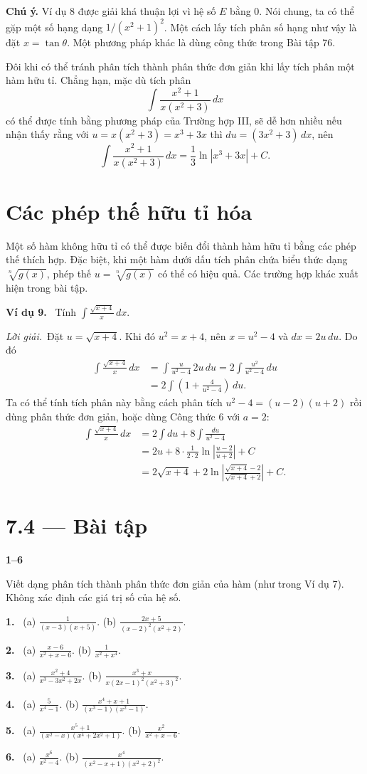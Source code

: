 \documentclass[12pt,a4paper]{article}
\newcommand{\ex}[1]{\par\medskip\noindent\textbf{Ví dụ #1.}\ }
\newcommand{\sol}{\par\nopagebreak[4]\noindent\textit{Lời giải.}\ }
\newcommand{\bt}[1]{\par\smallskip\Needspace{5\baselineskip}\noindent\textbf{#1.}\ }
\newcommand{\group}[1]{\par\Needspace{11\baselineskip}\medskip\noindent\textbf{#1}\par\nopagebreak[4]}
\begin{document}
\textbf{Chú ý.} Ví dụ 8 được giải khá thuận lợi vì hệ số $E$ bằng $0$. Nói chung, ta có thể gặp một số hạng dạng $1/(x^2+1)^2$. Một cách lấy tích phân số hạng như vậy là đặt $x=\tan\theta$. Một phương pháp khác là dùng công thức trong Bài tập 76.

Đôi khi có thể tránh phân tích thành phân thức đơn giản khi lấy tích phân một hàm hữu tỉ. Chẳng hạn, mặc dù tích phân
\[\int\frac{x^2+1}{x(x^2+3)}\,dx\]
có thể được tính bằng phương pháp của Trường hợp III, sẽ dễ hơn nhiều nếu nhận thấy rằng với $u=x(x^2+3)=x^3+3x$ thì $du=(3x^2+3)\,dx$, nên
\[\int\frac{x^2+1}{x(x^2+3)}\,dx=\frac13\ln|x^3+3x|+C.\]

\section*{Các phép thế hữu tỉ hóa}
Một số hàm không hữu tỉ có thể được biến đổi thành hàm hữu tỉ bằng các phép thế thích hợp. Đặc biệt, khi một hàm dưới dấu tích phân chứa biểu thức dạng $\sqrt[n]{g(x)}$, phép thế $u=\sqrt[n]{g(x)}$ có thể có hiệu quả. Các trường hợp khác xuất hiện trong bài tập.

\ex{9} Tính $\displaystyle\int\frac{\sqrt{x+4}}x\,dx$.
\sol Đặt $u=\sqrt{x+4}$. Khi đó $u^2=x+4$, nên $x=u^2-4$ và $dx=2u\,du$. Do đó
\begin{align*}
\int\frac{\sqrt{x+4}}x\,dx&=\int\frac{u}{u^2-4}\,2u\,du
=2\int\frac{u^2}{u^2-4}\,du\\
&=2\int\left(1+\frac4{u^2-4}\right)\,du.
\end{align*}
Ta có thể tính tích phân này bằng cách phân tích $u^2-4=(u-2)(u+2)$ rồi dùng phân thức đơn giản, hoặc dùng Công thức 6 với $a=2$:
\begin{align*}
\int\frac{\sqrt{x+4}}x\,dx&=2\int du+8\int\frac{du}{u^2-4}\\
&=2u+8\cdot\frac1{2\cdot2}\ln\left|\frac{u-2}{u+2}\right|+C\\
&=2\sqrt{x+4}+2\ln\left|\frac{\sqrt{x+4}-2}{\sqrt{x+4}+2}\right|+C.
\end{align*}
\section*{7.4 — Bài tập}
\group{1–6} Viết dạng phân tích thành phân thức đơn giản của hàm (như trong Ví dụ 7). Không xác định các giá trị số của hệ số.
\bt{1} (a) $\displaystyle\frac1{(x-3)(x+5)}$. \qquad (b) $\displaystyle\frac{2x+5}{(x-2)^2(x^2+2)}$.
\bt{2} (a) $\displaystyle\frac{x-6}{x^2+x-6}$. \qquad (b) $\displaystyle\frac1{x^2+x^4}$.
\bt{3} (a) $\displaystyle\frac{x^2+4}{x^3-3x^2+2x}$. \qquad (b) $\displaystyle\frac{x^3+x}{x(2x-1)^2(x^2+3)^2}$.
\bt{4} (a) $\displaystyle\frac5{x^4-1}$. \qquad (b) $\displaystyle\frac{x^4+x+1}{(x^3-1)(x^2-1)}$.
\bt{5} (a) $\displaystyle\frac{x^5+1}{(x^2-x)(x^4+2x^2+1)}$. \qquad (b) $\displaystyle\frac{x^2}{x^2+x-6}$.
\bt{6} (a) $\displaystyle\frac{x^6}{x^2-4}$. \qquad (b) $\displaystyle\frac{x^4}{(x^2-x+1)(x^2+2)^2}$.
\end{document}
